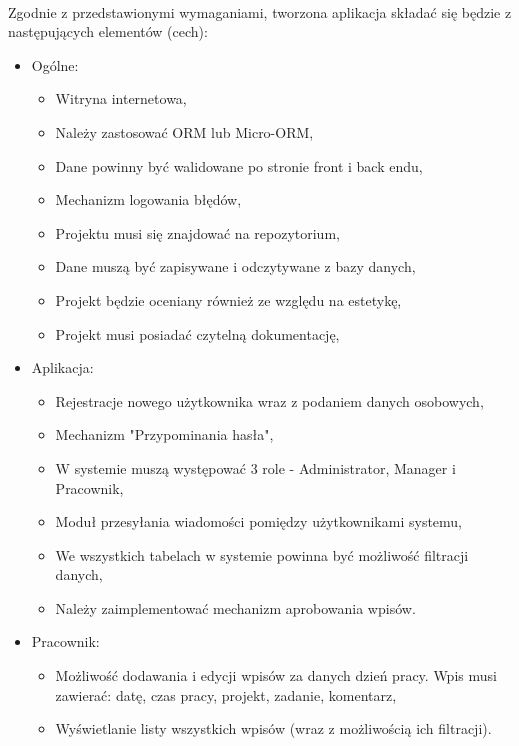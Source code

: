 \documentclass[a4paper, 12pt, oneside]{article}
\begin{document}
		\paragraph{}Zgodnie z przedstawionymi wymaganiami, tworzona aplikacja składać się będzie z następujących elementów (cech):
		\begin{itemize}
		
		\item Ogólne:
		
			\begin{itemize}
				\item Witryna internetowa,
				\item Należy zastosować ORM lub Micro-ORM,
				\item Dane powinny być walidowane po stronie front i back endu,
				\item Mechanizm logowania błędów,
				\item Projektu musi się znajdować na repozytorium,
				\item Dane muszą być zapisywane i odczytywane z bazy danych,
				\item Projekt będzie oceniany również ze względu na estetykę,
				\item Projekt musi posiadać czytelną dokumentację,
			\end{itemize}
			
		\item Aplikacja:
		
		\begin{itemize}
			\item Rejestracje nowego użytkownika wraz z podaniem danych osobowych,
			\item Mechanizm "Przypominania hasła",
			\item W systemie muszą występować 3 role - Administrator, Manager i Pracownik,
			\item Moduł przesyłania wiadomości pomiędzy użytkownikami systemu,
			\item We wszystkich tabelach w systemie powinna być możliwość filtracji danych,
			\item Należy zaimplementować mechanizm aprobowania wpisów.
		\end{itemize}
		
		\item Pracownik:
			\begin{itemize}
			
			\item Możliwość dodawania i edycji wpisów za danych dzień pracy. Wpis musi zawierać: datę, czas pracy, projekt, zadanie, komentarz,
			\item Wyświetlanie listy wszystkich wpisów (wraz z możliwością ich filtracji).
		

\end{itemize}
\end{itemize}
\end{document}
